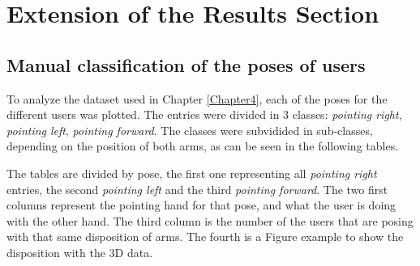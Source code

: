 
\chapter{Extension of the Results Section} %

\label{AppendixA} %


\section{Manual classification of the poses of users}

To analyze the dataset used in Chapter \ref{Chapter4}, each of the poses for the different users was plotted. The entries were divided in 3 classes: \emph{pointing right}, \emph{pointing left}, \emph{pointing forward}. The classes were subvidided in sub-classes, depending on the position of both arms, as can be seen in the following tables.

The tables are divided by pose, the first one representing all \emph{pointing right} entries, the second \emph{pointing left} and the third \emph{pointing forward}. The two first columns represent the pointing hand for that pose, and what the user is doing with the other hand. The third column is the number of the users that are posing with that same disposition of arms. The fourth is a Figure example to show the disposition with the 3D data.

